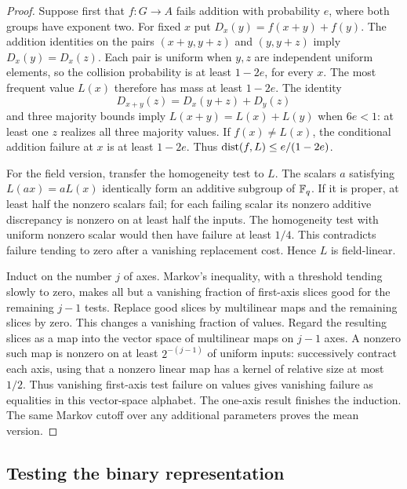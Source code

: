 \begin{proof}
Suppose first that \(f:G\to A\) fails addition with probability
\(e\), where both groups have exponent two.  For fixed \(x\) put
\(D_x(y)=f(x+y)+f(y)\).  The addition identities on the pairs
\((x+y,y+z)\) and \((y,y+z)\) imply \(D_x(y)=D_x(z)\).
Each pair is uniform when \(y,z\) are independent uniform elements,
so the collision probability is at least \(1-2e\), for every \(x\).
The most frequent value \(L(x)\) therefore has mass at least
\(1-2e\).  The identity
\[
 D_{x+y}(z)=D_x(y+z)+D_y(z)
\]
and three majority bounds imply \(L(x+y)=L(x)+L(y)\) when
\(6e<1\): at least one \(z\) realizes all three majority values.
If \(f(x)\ne L(x)\), the conditional addition failure at \(x\)
is at least \(1-2e\).  Thus
\(\operatorname{dist}(f,L)\le e/(1-2e)\).

For the field version, transfer the homogeneity test to \(L\).
The scalars \(a\) satisfying \(L(ax)=aL(x)\) identically form an
additive subgroup of \(\mathbb{F}_q\).  If it is proper, at least half the
nonzero scalars fail; for each failing scalar its nonzero additive
discrepancy is nonzero on at least half the inputs.  The homogeneity
test with uniform nonzero scalar would then have failure at least
\(1/4\).  This contradicts failure tending to zero after a vanishing
replacement cost.  Hence \(L\) is field-linear.

Induct on the number \(j\) of axes.  Markov's inequality, with a
threshold tending slowly to zero, makes all but a vanishing fraction
of first-axis slices good for the remaining \(j-1\) tests.  Replace
good slices by multilinear maps and the remaining slices by zero.
This changes a vanishing fraction of values.  Regard the resulting
slices as a map into the vector space of multilinear maps on
\(j-1\) axes.  A nonzero such map is nonzero on at least
\(2^{-(j-1)}\) of uniform inputs: successively contract each axis,
using that a nonzero linear map has a kernel of relative size at most
\(1/2\).  Thus vanishing first-axis test failure on values gives
vanishing failure as equalities in this vector-space alphabet.
The one-axis result finishes the induction.  The same Markov cutoff
over any additional parameters proves the mean version.
\end{proof}

\subsection{Testing the binary representation}
\label{ib:testing}

